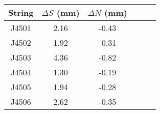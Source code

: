 \begin{tabular}{cccccc}
\toprule
String &  $\Delta S$ (mm) &  $\Delta N$ (mm) \\
\midrule
 J4501 &             2.16 &            -0.43 \\
 J4502 &             1.92 &            -0.31 \\
 J4503 &             4.36 &            -0.82 \\
 J4504 &             1.30 &            -0.19 \\
 J4505 &             1.94 &            -0.28 \\
 J4506 &             2.62 &            -0.35 \\
\bottomrule
\end{tabular}

